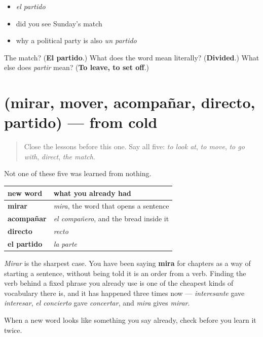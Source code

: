 \begin{itemize}
\raggedright
  \item \emph{el partido}
  \item did you see Sunday's match
  \item why a political party is also \emph{un partido}
\end{itemize}

\begin{tcolorbox}[breakable,colback=teal!4,colframe=teal!35!black,title={Before you move on}]
The match? (\textbf{El partido}.) What does the word mean literally? (\textbf{Divided}.) What else does \emph{partir} mean? (\textbf{To leave, to set off}.)
\end{tcolorbox}
\section[(mirar, mover, acompañar, directo …]{(mirar, mover, acompañar, directo, partido) — from cold}

\label{lesson:ES-R446-repaso-mover}



\begin{quote}
Close the lessons before this one. Say all five: \emph{to look at}, \emph{to move}, \emph{to go with}, \emph{direct}, \emph{the match}.
\end{quote}

\begin{grammarlens}[title={Grammar Lens: you owned four of these already}]
Not one of these five was learned from nothing.

\noindent
\begin{tabularx}{\linewidth}{@{}>{\raggedright\arraybackslash}X>{\raggedright\arraybackslash}X@{}}
\toprule
\textbf{new word} & \textbf{what you already had} \\
\midrule
\textbf{mirar} & \emph{mira}, the word that opens a sentence \\
\textbf{acompañar} & \emph{el compañero}, and the bread inside it \\
\textbf{directo} & \emph{recto} \\
\textbf{el partido} & \emph{la parte} \\
\bottomrule
\end{tabularx}

\emph{Mirar} is the sharpest case. You have been saying \textbf{mira} for chapters as a way of starting a sentence, without being told it is an order from a verb. Finding the verb behind a fixed phrase you already use is one of the cheapest kinds of vocabulary there is, and it has happened three times now — \emph{interesante} gave \emph{interesar}, \emph{el concierto} gave \emph{concertar}, and \emph{mira} gives \emph{mirar}.

When a new word looks like something you say already, check before you learn it twice.
\end{grammarlens}

